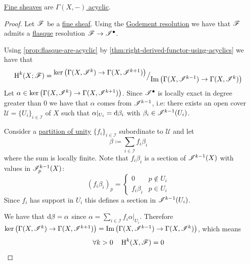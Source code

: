 \documentclass[../../main]{subfiles}
\begin{document}
\begin{proposition} \label{prop:fine-are-acyclic}
  \hyperref[def:fine-sheaf]{Fine sheaves} are \hyperref[def:F-acyclic-object]{\(\Gamma(X, -)\) acyclic}.
\end{proposition}
\begin{proof}
  Let \(\mathscr{F}\) be a \hyperref[def:fine-sheaf]{fine sheaf}.
  Using the \hyperref[def:godement-resolution]{Godement resolution} we have that \(\mathscr{F}\) admits a \hyperref[def:flasque-sheaf]{flasque} resolution \(\mathscr{F} \to \mathscr{I}^{\bullet}\).

  Using \autoref{prop:flasque-are-acyclic} by \autoref{thm:right-derived-functor-using-acyclics} we have that
  \begin{equation*}
    \operatorname{H}^{k}(X; \mathscr{F}) = {^{\textstyle \ker\left( \Gamma(X, \mathscr{I}^{k}) \to \Gamma(X, \mathscr{I}^{k+1}) \right)}\big/_{\textstyle \operatorname{Im} \left( \Gamma(X, \mathscr{I}^{k-1}) \to \Gamma(X, \mathscr{I}^{k}) \right)}}
  \end{equation*}
  Let \(\alpha \in \ker\left( \Gamma(X, \mathscr{I}^{k}) \to \Gamma(X, \mathscr{I}^{k+1}) \right)\).
  Since \(\mathscr{I}^{\bullet}\) is locally exact in degree greater than 0 we have that \(\alpha\) comes from \(\mathscr{I}^{k-1}\), i.e: there exists an open cover \(\mathscr{U} = \{U_{i}\}_{i \in \mathcal{I}}\) of \(X\) such that \(\alpha|_{U_{i}} = \mathrm{d}\beta_{i}\) with \(\beta_{i} \in \mathscr{I}^{k-1}(U_{i})\).

  Consider a \hyperref[def:partition-of-unity]{partition of unity} \(\{f_{i}\}_{i \in \mathcal{I}}\) subordinate to \(\mathscr{U}\) and let
  \begin{equation*}
    \beta \coloneq \sum_{i \in \mathcal{I}} f_{i}\beta_{i}
  \end{equation*}
  where the sum is locally finite.
  Note that \(f_{i}\beta_{i}\) is a section of \(\mathscr{I}^{k-1}(X)\) with values in \(\mathscr{I}_{p}^{k-1}(X)\):
  \begin{equation*}
    (f_{i}\beta_{i})_{p} = \begin{cases}
      0 & p \notin U_{i} \\
      f_{i}\beta_{i} & p \in U_{i}
    \end{cases}
  \end{equation*}
  Since \(f_{i}\) has support in \(U_{i}\) this defines a section in \(\mathscr{I}^{k-1}(U_{i})\).

  We have that \(\mathrm{d}\beta = \alpha\) since \(\alpha = \sum_{i \in \mathcal{I}} f_{i}\alpha|_{U_{i}}\).
  Therefore \(\ker\left( \Gamma(X, \mathscr{I}^{k}) \to \Gamma(X, \mathscr{I}^{k+1}) \right) = \operatorname*{Im} \left( \Gamma(X, \mathscr{I}^{k-1}) \to \Gamma(X, \mathscr{I}^{k}) \right)\), which means
  \begin{equation*}
    \forall k > 0 \quad \operatorname{H}^{k}(X, \mathscr{F}) = 0 \qedhere
  \end{equation*}
\end{proof}
\end{document}
